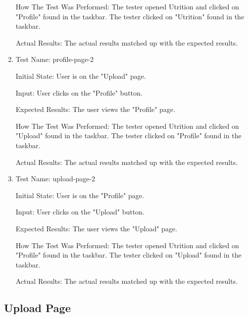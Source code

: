 \documentclass[12pt, titlepage]{article}
\begin{document}
\begin{enumerate}
	How The Test Was Performed: The tester opened Utrition and clicked on "Profile" found in the taskbar. The tester clicked on "Utrition" found in the taskbar.
	
	Actual Results: The actual results matched up with the expected results.
	
	\item{Test Name: profile-page-2}
	
	Initial State: User is on the "Upload" page.
	
	Input: User clicks on the "Profile" button.
	
	Expected Results: The user views the "Profile" page.
	
	How The Test Was Performed: The tester opened Utrition and clicked on "Upload" found in the taskbar. The tester clicked on "Profile" found in the taskbar.
	
	Actual Results: The actual results matched up with the expected results.
	
	\item{Test Name: upload-page-2}
	
	Initial State: User is on the "Profile" page.
	
	Input: User clicks on the "Upload" button.
	
	Expected Results: The user views the "Upload" page.
	
	How The Test Was Performed: The tester opened Utrition and clicked on "Profile" found in the taskbar. The tester clicked on "Upload" found in the taskbar.
	
	Actual Results: The actual results matched up with the expected results.
	\end{enumerate}

	\subsection{Upload Page}
\end{document}
